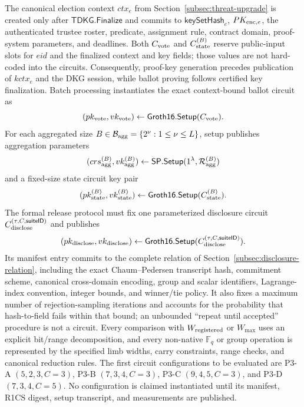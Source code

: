 \documentclass[pdflatex,sn-mathphys-num]{sn-jnl}%
\theoremstyle{thmstyleone}%
\theoremstyle{thmstyletwo}%
\theoremstyle{thmstylethree}%
\begin{document}
The canonical election context $ctx_e$ from Section~\ref{subsec:threat-upgrade} is created only after $\mathsf{TDKG.Finalize}$ and commits to $\mathsf{keySetHash}_e$, $PK_{{\rm enc},e}$, the authenticated trustee roster, predicate, assignment rule, contract domain, proof-system parameters, and deadlines. Both $C_{\rm vote}$ and $C_{\rm state}^{(B)}$ reserve public-input slots for $eid$ and the finalized context and key fields; those values are not hard-coded into the circuits. Consequently, proof-key generation precedes publication of $kctx_e$ and the DKG session, while ballot proving follows certified key finalization. Batch processing instantiates the exact context-bound ballot circuit as
\[
 (pk_{\rm vote},vk_{\rm vote})\leftarrow
 \mathsf{Groth16.Setup}(C_{\rm vote}).
\]
For each aggregated size $B\in\mathcal{B}_{\rm agg}=\{2^\nu:1\leq\nu\leq L\}$, setup publishes aggregation parameters
\[
 (crs_{\rm agg}^{(B)},vk_{\rm agg}^{(B)})\leftarrow
 \mathsf{SP.Setup}(1^\lambda,\mathcal{R}_{\rm agg}^{(B)})
\]
and a fixed-size state circuit key pair
\[
 (pk_{\rm state}^{(B)},vk_{\rm state}^{(B)})\leftarrow
 \mathsf{Groth16.Setup}(C_{\rm state}^{(B)}).
\]
The formal release protocol must fix one parameterized disclosure circuit
$C_{\rm disclose}^{(\tau,C,\mathsf{suiteID})}$ and publishes
\[
 (pk_{\rm disclose},vk_{\rm disclose})\leftarrow
 \mathsf{Groth16.Setup}(C_{\rm disclose}^{(\tau,C,\mathsf{suiteID})}).
\]
Its manifest entry commits to the complete relation of
Section~\ref{subsec:disclosure-relation}, including the exact
Chaum--Pedersen transcript hash, commitment scheme, canonical cross-domain
encoding, group and scalar identifiers, Lagrange-index convention, integer
bounds, and winner/tie policy.
It also fixes a maximum number of rejection-sampling iterations and accounts
for the probability that hash-to-field fails within that bound; an unbounded
``repeat until accepted'' procedure is not a circuit.  Every comparison with
$W_{\rm registered}$ or $W_{\max}$ uses an explicit bit/range decomposition,
and every non-native $\mathbb F_q$ or group operation is represented by the
specified limb widths, carry constraints, range checks, and canonical
reduction rules.  The first circuit configurations to be evaluated are P3-A
$(5,2,3,C=3)$, P3-B $(7,3,4,C=3)$, P3-C $(9,4,5,C=3)$, and P3-D
$(7,3,4,C=5)$.  No configuration is claimed instantiated until its manifest,
R1CS digest, setup transcript, and measurements are published.
\end{document}
